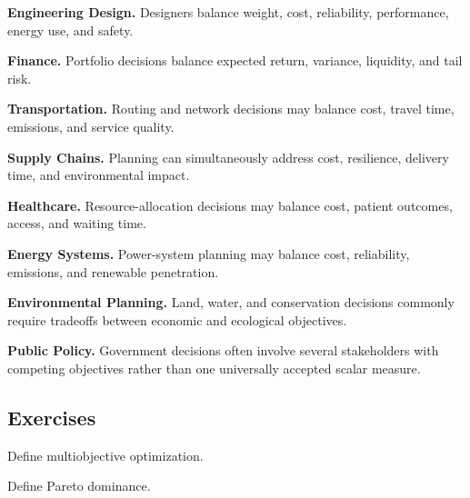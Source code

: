 \begin{applicationbox}

\textbf{Engineering Design.}
Designers balance weight, cost, reliability, performance, energy use, and
safety.

\medskip

\textbf{Finance.}
Portfolio decisions balance expected return, variance, liquidity, and
tail risk.

\medskip

\textbf{Transportation.}
Routing and network decisions may balance cost, travel time, emissions,
and service quality.

\medskip

\textbf{Supply Chains.}
Planning can simultaneously address cost, resilience, delivery time, and
environmental impact.

\medskip

\textbf{Healthcare.}
Resource-allocation decisions may balance cost, patient outcomes, access,
and waiting time.

\medskip

\textbf{Energy Systems.}
Power-system planning may balance cost, reliability, emissions, and
renewable penetration.

\medskip

\textbf{Environmental Planning.}
Land, water, and conservation decisions commonly require tradeoffs between
economic and ecological objectives.

\medskip

\textbf{Public Policy.}
Government decisions often involve several stakeholders with competing
objectives rather than one universally accepted scalar measure.

\end{applicationbox}

\subsection{Exercises}
\label{subsec:multiobjective-exercises}

\begin{exercise}[1]
Define multiobjective optimization.
\end{exercise}

\begin{exercise}[1]
Define Pareto dominance.
\end{exercise}

